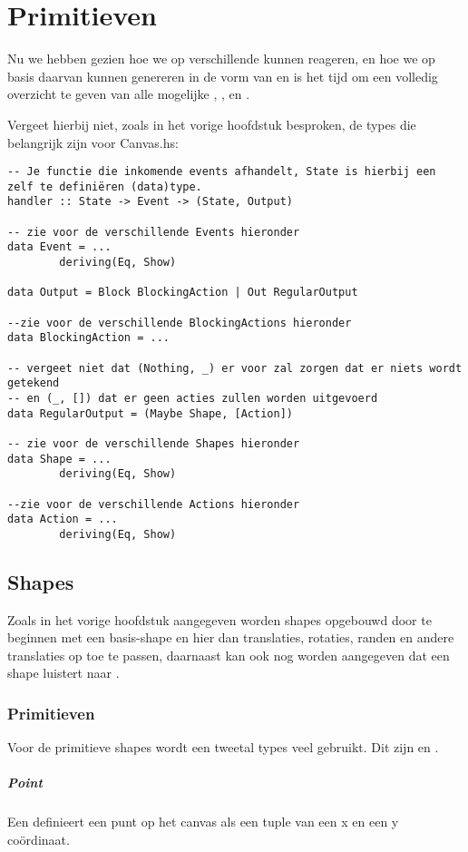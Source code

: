 \section{Primitieven}
Nu we hebben gezien hoe we op verschillende \events kunnen reageren, en hoe we op basis daarvan  kunnen genereren in de vorm van \shapes en \actions is het tijd om een volledig overzicht te geven van alle mogelijke \events , \shapes , en \actions.

Vergeet hierbij niet, zoals in het vorige hoofdstuk besproken, de types die belangrijk zijn voor Canvas.hs:

\begin{lstlisting}
-- Je functie die inkomende events afhandelt, State is hierbij een zelf te definiëren (data)type.
handler :: State -> Event -> (State, Output)

-- zie voor de verschillende Events hieronder
data Event = ...
		deriving(Eq, Show)

data Output = Block BlockingAction | Out RegularOutput

--zie voor de verschillende BlockingActions hieronder
data BlockingAction = ... 

-- vergeet niet dat (Nothing, _) er voor zal zorgen dat er niets wordt getekend 
-- en (_, []) dat er geen acties zullen worden uitgevoerd
data RegularOutput = (Maybe Shape, [Action])

-- zie voor de verschillende Shapes hieronder
data Shape = ...
		deriving(Eq, Show)

--zie voor de verschillende Actions hieronder
data Action = ...
		deriving(Eq, Show)
\end{lstlisting}

\subsection{Shapes}
Zoals in het vorige hoofdstuk aangegeven worden shapes opgebouwd door te beginnen met een basis-shape en hier dan translaties, rotaties, randen en andere translaties op toe te passen, daarnaast kan ook nog worden aangegeven dat een shape luistert naar \events.

\subsubsection{Primitieven}
Voor de primitieve shapes wordt een tweetal types veel gebruikt. Dit zijn  en . 

\subparagraph{Point}
Een  definieert een punt op het canvas als een tuple van een x en een y coördinaat. 

